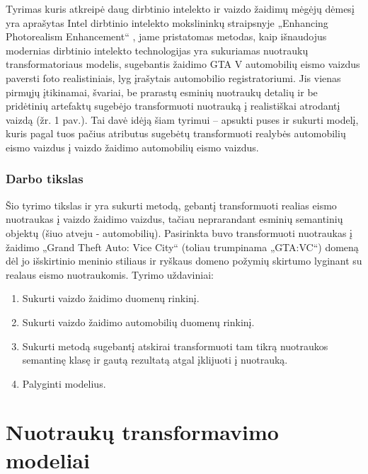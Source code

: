 \documentclass{VUMIFPSbakalaurinis}
\begin{document}
    Tyrimas kuris atkreipė daug dirbtinio intelekto ir vaizdo žaidimų mėgėjų dėmesį yra aprašytas Intel dirbtinio intelekto mokslininkų straipsnyje „Enhancing Photorealism Enhancement“ \cite{EnPhEn}, jame pristatomas metodas, kaip išnaudojus modernias dirbtinio intelekto technologijas yra sukuriamas nuotraukų transformatoriaus modelis, sugebantis žaidimo GTA V automobilių eismo vaizdus paversti foto realistiniais, lyg įrašytais automobilio registratoriumi. Jis vienas pirmųjų įtikinamai, švariai, be prarastų esminių nuotraukų detalių ir be pridėtinių artefaktų sugebėjo transformuoti nuotrauką į realistiškai atrodantį vaizdą (žr. 1 pav.). Tai davė idėją šiam tyrimui – apsukti puses ir sukurti modelį, kuris pagal tuos pačius atributus sugebėtų transformuoti realybės automobilių eismo vaizdus į vaizdo žaidimo automobilių eismo vaizdus.

    \subsubsection*{Darbo tikslas}
        Šio tyrimo tikslas ir yra sukurti metodą, gebantį transformuoti realias eismo nuotraukas į vaizdo žaidimo vaizdus, tačiau neprarandant esminių semantinių objektų (šiuo atveju - automobilių). Pasirinkta buvo transformuoti nuotraukas į  žaidimo „Grand Theft Auto: Vice City“ (toliau trumpinama „GTA:VC“) domeną dėl jo išskirtinio meninio stiliaus ir ryškaus domeno požymių skirtumo lyginant su realaus eismo nuotraukomis. Tyrimo uždaviniai:
        \begin{enumerate}
            \item Sukurti vaizdo žaidimo duomenų rinkinį.
            \item Sukurti vaizdo žaidimo automobilių duomenų rinkinį.
            \item Sukurti metodą sugebantį atskirai transformuoti tam tikrą nuotraukos semantinę klasę ir gautą rezultatą atgal įklijuoti į nuotrauką. 
            \item Palyginti modelius.
        \end{enumerate}

        \nocite{*}

\section{Nuotraukų transformavimo modeliai}
\end{document}
